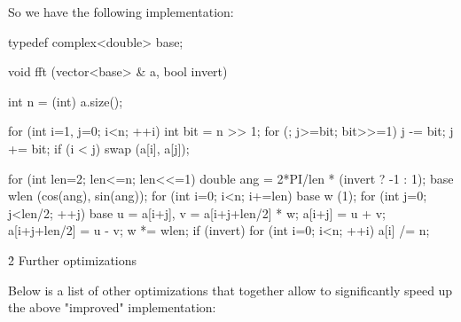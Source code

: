 So we have the following implementation:

\code
typedef complex<double> base;

void fft (vector<base> & a, bool invert) {
int n = (int) a.size();

for (int i=1, j=0; i<n; ++i) {
int bit = n >> 1;
for (; j>=bit; bit>>=1)
j -= bit;
j += bit;
if (i < j)
swap (a[i], a[j]);
}

for (int len=2; len<=n; len<<=1) {
double ang = 2*PI/len * (invert ? -1 : 1);
base wlen (cos(ang), sin(ang));
for (int i=0; i<n; i+=len) {
base w (1);
for (int j=0; j<len/2; ++j) {
base u = a[i+j], v = a[i+j+len/2] * w;
a[i+j] = u + v;
a[i+j+len/2] = u - v;
w *= wlen;
}
}
}
if (invert)
for (int i=0; i<n; ++i)
a[i] /= n;
}
\endcode


\h2{ Further optimizations }

Below is a list of other optimizations that together allow to significantly speed up the above "improved" implementation:

